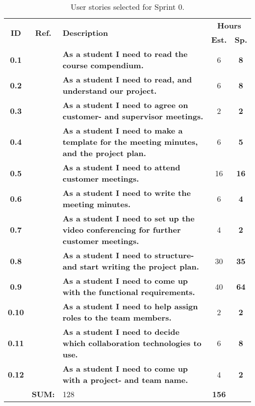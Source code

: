 \begin{table*}[!ht]
\caption{User stories selected for Sprint 0. }
\label{tab:sprint0stories}
\def\arraystretch{1.25}
\begin{tabularx}{\textwidth}{ccXcc} 
\toprule[1mm]

\multirow{2}{*}{\textbf{ID}} &
\multirow{2}{*}{\textbf{Ref.}} & \multirow{2}{*}{\textbf{Description}} & \multicolumn{2}{c}{\textbf{Hours}} \\
 					& & & \textbf{Est.} & \textbf{Sp.} \\

\midrule
\textbf{0.1} 	&
	& \textbf{As a student I need to read the course compendium.} 										& 		6	& \textbf{8} \\

\textbf{0.2} 	&
	& \textbf{As a student I need to read, and understand our project.} 								& 		6	& \textbf{8} \\	


\textbf{0.3} 	&
	& \textbf{As a student I need to agree on customer- and supervisor meetings.} 						& 		2	& \textbf{2} \\


\textbf{0.4} 	& 
	& {\bf As a student I need to make a template for the meeting minutes, and the project plan.} 		& 		6	& \textbf{5} \\

\textbf{0.5} 	&
	& \textbf{As a student I need to attend customer meetings.} 										&  		16	& \textbf{16} \\

\textbf{0.6} 	&
	& \textbf{As a student I need to write the meeting minutes.} 										&  		6	& \textbf{4} \\

\textbf{0.7} 	&
	& \textbf{As a student I need to set up the video conferencing for further customer meetings.} 		& 		4	& \textbf{2} \\

\textbf{0.8} 	&
	& \textbf{As a student I need to structure- and start writing the project plan.} 					&  		30	& \textbf{35} \\

\textbf{0.9} 	&
	& \textbf{As a student I need to come up with the functional requirements.} 						&  		40	& \textbf{64} \\

\textbf{0.10} 	&
	& \textbf{As a student I need to help assign roles to the team members.} 							& 		2	& \textbf{2} \\

\textbf{0.11} 	&
	& \textbf{As a student I need to decide which collaboration technologies to use.} 					& 		6	& \textbf{8} \\
\textbf{0.12} 	& 
	& \textbf{As a student I need to come up with a project- and team name.} 							& 		4	& \textbf{2} \\
\midrule
				& \textbf{SUM:}		&		128	& \textbf{156}
 \\																			
\bottomrule[1mm]
\end{tabularx}
\end{table*}